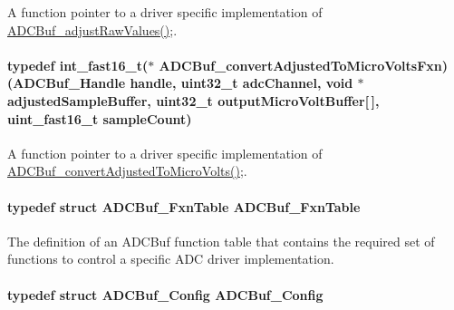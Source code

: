 A function pointer to a driver specific implementation of \hyperlink{_a_d_c_buf_8h_a6967c459b64a71b344bd88eb7fbaa097}{A\+D\+C\+Buf\+\_\+adjust\+Raw\+Values()};. 

\paragraph[{A\+D\+C\+Buf\+\_\+convert\+Adjusted\+To\+Micro\+Volts\+Fxn}]{\setlength{\rightskip}{0pt plus 5cm}typedef int\+\_\+fast16\+\_\+t($\ast$ A\+D\+C\+Buf\+\_\+convert\+Adjusted\+To\+Micro\+Volts\+Fxn) ({\bf A\+D\+C\+Buf\+\_\+\+Handle} handle, uint32\+\_\+t adc\+Channel, void $\ast$adjusted\+Sample\+Buffer, uint32\+\_\+t output\+Micro\+Volt\+Buffer\mbox{[}$\,$\mbox{]}, uint\+\_\+fast16\+\_\+t sample\+Count)}\label{_a_d_c_buf_8h_a6ffaac5eaa1253f9b78bbaa6952e1162}


A function pointer to a driver specific implementation of \hyperlink{_a_d_c_buf_8h_ad0d8a8edbb43194a61d1284a10b02a8c}{A\+D\+C\+Buf\+\_\+convert\+Adjusted\+To\+Micro\+Volts()};. 

\paragraph[{A\+D\+C\+Buf\+\_\+\+Fxn\+Table}]{\setlength{\rightskip}{0pt plus 5cm}typedef struct {\bf A\+D\+C\+Buf\+\_\+\+Fxn\+Table}  {\bf A\+D\+C\+Buf\+\_\+\+Fxn\+Table}}\label{_a_d_c_buf_8h_a622617414025f3735e241d4ee58c8f5a}


The definition of an A\+D\+C\+Buf function table that contains the required set of functions to control a specific A\+D\+C driver implementation. 

\paragraph[{A\+D\+C\+Buf\+\_\+\+Config}]{\setlength{\rightskip}{0pt plus 5cm}typedef struct {\bf A\+D\+C\+Buf\+\_\+\+Config}  {\bf A\+D\+C\+Buf\+\_\+\+Config}}\label{_a_d_c_buf_8h_a630c696a789e6c298dc97b960f72e3d1}


